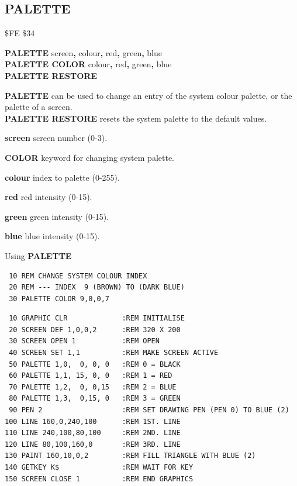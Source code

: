 
\newpage
\subsection{PALETTE}
\begin{description}[leftmargin=2cm,style=nextline]
\item [Token:] \$FE \$34
\item [Format:] {\bf PALETTE} screen{\bf,} colour{\bf,} red{\bf,} green{\bf,} blue \\
		{\bf PALETTE COLOR} colour{\bf,} red{\bf,} green{\bf,} blue \\
                {\bf PALETTE RESTORE}
\item [Usage:]  {\bf PALETTE} can be used to change an
                entry of the system colour palette, or the palette
                of a screen. \\
                {\bf PALETTE RESTORE} resets the system palette to
                the default values.

                {\bf screen} screen number (0-3).

                {\bf COLOR} keyword for changing system palette.

                {\bf colour} index to palette (0-255).

                {\bf red} red intensity (0-15).

                {\bf green} green intensity (0-15).

                {\bf blue} blue intensity (0-15).

\item [Example:] Using {\bf PALETTE}

\begin{tcolorbox}[colback=black,coltext=white]
\verbatimfont{\codefont}
\begin{verbatim}
 10 REM CHANGE SYSTEM COLOUR INDEX
 20 REM --- INDEX  9 (BROWN) TO (DARK BLUE)
 30 PALETTE COLOR 9,0,0,7
\end{verbatim}
\end{tcolorbox}

\begin{tcolorbox}[colback=black,coltext=white]
\verbatimfont{\codefont}
\begin{verbatim}
 10 GRAPHIC CLR             :REM INITIALISE
 20 SCREEN DEF 1,0,0,2      :REM 320 X 200
 30 SCREEN OPEN 1           :REM OPEN
 40 SCREEN SET 1,1          :REM MAKE SCREEN ACTIVE
 50 PALETTE 1,0,  0, 0, 0   :REM 0 = BLACK
 60 PALETTE 1,1, 15, 0, 0   :REM 1 = RED
 70 PALETTE 1,2,  0, 0,15   :REM 2 = BLUE
 80 PALETTE 1,3,  0,15, 0   :REM 3 = GREEN
 90 PEN 2                   :REM SET DRAWING PEN (PEN 0) TO BLUE (2)
100 LINE 160,0,240,100      :REM 1ST. LINE
110 LINE 240,100,80,100     :REM 2ND. LINE
120 LINE 80,100,160,0       :REM 3RD. LINE
130 PAINT 160,10,0,2        :REM FILL TRIANGLE WITH BLUE (2)
140 GETKEY K$               :REM WAIT FOR KEY
150 SCREEN CLOSE 1          :REM END GRAPHICS
\end{verbatim}
\end{tcolorbox}
\end{description}

